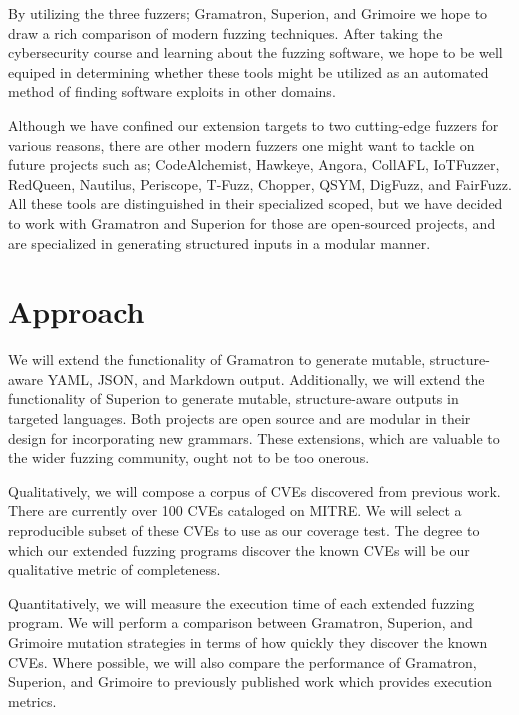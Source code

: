 \documentclass[12pt]{diazessay}
\begin{document}
By utilizing the three fuzzers; Gramatron, Superion, and Grimoire we hope to draw a rich comparison of modern fuzzing techniques.
After taking the cybersecurity course and learning about the fuzzing software, we hope to be well equiped in determining whether these tools might be utilized as an automated method of finding software exploits in other domains.

Although we have confined our extension targets to two cutting-edge fuzzers for various reasons, there are other modern fuzzers one might want to tackle on future projects such as;
CodeAlchemist\cite{CodeAlchemist1}\cite{CodeAlchemist2}, Hawkeye\cite{Hawkeye}, Angora\cite{Angora1}\cite{Angora2}, CollAFL\cite{CollAFL}, IoTFuzzer\cite{IoTFuzzer}, RedQueen\cite{redqueen}, Nautilus\cite{Nautilus1}\cite{Nautilus2}, Periscope\cite{PeriScope1}\cite{PeriScope2}, T-Fuzz\cite{TFuzz1}\cite{TFuzz2}, Chopper\cite{Chopper}, QSYM\cite{QSYM1}\cite{QSYM2}, DigFuzz\cite{DigFuzz}, and FairFuzz\cite{FairFuzz1}\cite{FairFuzz2}.
All these tools are distinguished in their specialized scoped, but we have decided to work with Gramatron and Superion for those are open-sourced projects, and are specialized in generating structured inputs in a modular manner.



\section*{Approach}

We will extend the functionality of Gramatron to generate mutable, structure-aware YAML, JSON, and Markdown output.
Additionally, we will extend the functionality of Superion to generate mutable, structure-aware outputs in targeted languages.
Both projects are open source and are modular in their design for incorporating new grammars.
These extensions, which are valuable to the wider fuzzing community, ought not to be too onerous.

Qualitatively, we will compose a corpus of CVEs discovered from previous work.
There are currently over 100 CVEs cataloged on MITRE\cite{MITRE}.
We will select a reproducible subset of these CVEs to use as our coverage test.
The degree to which our extended fuzzing programs discover the known CVEs will be our qualitative metric of completeness.

Quantitatively, we will measure the execution time of each extended fuzzing program.
We will perform a comparison between Gramatron, Superion, and Grimoire mutation strategies in terms of how quickly they discover the known CVEs.
Where possible, we will also compare the performance of Gramatron, Superion, and Grimoire to previously published work which provides execution metrics.
\end{document}
